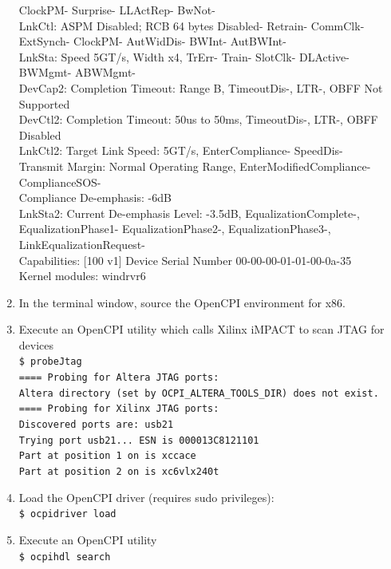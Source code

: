 \documentclass{article}
\newcommand{\terminaloutput}[1]{\texttt{#1}}
\begin{document}
\begin{enumerate}
{			ClockPM- Surprise- LLActRep- BwNot-\\
		LnkCtl:	ASPM Disabled; RCB 64 bytes Disabled- Retrain- CommClk-\\
			ExtSynch- ClockPM- AutWidDis- BWInt- AutBWInt-\\
		LnkSta:	Speed 5GT/s, Width x4, TrErr- Train- SlotClk- DLActive- BWMgmt- ABWMgmt-\\
		DevCap2: Completion Timeout: Range B, TimeoutDis-, LTR-, OBFF Not Supported\\
		DevCtl2: Completion Timeout: 50us to 50ms, TimeoutDis-, LTR-, OBFF Disabled\\
		LnkCtl2: Target Link Speed: 5GT/s, EnterCompliance- SpeedDis-\\
			 Transmit Margin: Normal Operating Range, EnterModifiedCompliance- ComplianceSOS-\\
			 Compliance De-emphasis: -6dB\\
		LnkSta2: Current De-emphasis Level: -3.5dB, EqualizationComplete-, EqualizationPhase1-
			 EqualizationPhase2-, EqualizationPhase3-, LinkEqualizationRequest-\\
	Capabilities: [100 v1] Device Serial Number 00-00-00-01-01-00-0a-35\\
	Kernel modules: windrvr6
		}\par\smallskip
\item In the terminal window, source the OpenCPI environment for x86.
\item Execute an OpenCPI utility which calls Xilinx iMPACT to scan JTAG for devices\smallskip
\noindent\terminaloutput{\\\$ probeJtag\\
==== Probing for Altera JTAG ports:\\
Altera directory (set by OCPI\_ALTERA\_TOOLS\_DIR) does not exist.\\
==== Probing for Xilinx JTAG ports:\\
Discovered ports are: usb21\\
Trying port usb21...  ESN is 000013C8121101\\
Part at position 1 on is xccace\\
Part at position 2 on is xc6vlx240t}\par\smallskip
\item Load the OpenCPI driver (requires sudo privileges):\smallskip
\noindent\terminaloutput{\\\$ ocpidriver load}
\item Execute an OpenCPI utility\smallskip
\noindent\terminaloutput{\\\$ ocpihdl search\\
}
\end{enumerate}
\end{document}
